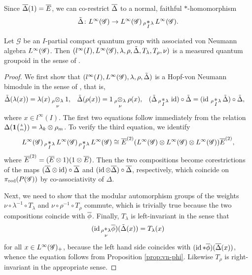 Since $\overline{\Delta}(1)=\overline{E}$, we can co-restrict $\overline{\Delta}$ to  a
normal, faithful $*$-homomorphism
\begin{align*}
  \tilde\Delta \colon L^{\infty}(\mathscr{G}) \to   L^{\infty}(\mathscr{G}) \,{}_{\rho}\!\underset{I}{\ast}\,\!\!_{\lambda}\, L^{\infty}(\mathscr{G}).
\end{align*}
\begin{Theorem}
  Let $\mathscr{G}$ be an $I$-partial compact quantum group with
  associated von Neumann algebra $L^{\infty}(\mathscr{G})$.  Then
  $(l^{\infty}(I),L^{\infty}(\mathscr{G}), \lambda,\rho,\tilde\Delta,
  T_{\lambda},T_{\rho},\nu)$ is a measured quantum groupoid in the
  sense of \cite{Eno2}.
\end{Theorem}
\begin{proof}
We first show that  $(l^{\infty}(I),L^{\infty}(\mathscr{G}),
\lambda,\rho,\tilde\Delta)$ is  a Hopf-von
  Neumann bimodule in the sense of  \cite{Val1}, that is, 
  \begin{align*}
  \tilde\Delta(\lambda(x)) &= \lambda(x) \underset{\nu{}}{_{\rho}\otimes_{\lambda}} 1, &
  \tilde\Delta(\rho(x)) &= 1 \underset{\nu{}}{_{\rho}\otimes_{\lambda}} \rho(x), &
  (\tilde\Delta \,{}_{\rho}\!\underset{I}{\ast}\,\!\!_{\lambda}\, \operatorname{id})\circ \tilde\Delta &= (\operatorname{id} \,{}_{\rho}\!\underset{I}{\ast}\,\!\!_{\lambda}\,
    \tilde\Delta) \circ \tilde\Delta,
\end{align*}
where $x\in l^{\infty}(I)$.
The first two equations follow immediately from the relation
$\Delta(\mathbf{1}{\tiny {\begin{pmatrix} k\\m\end{pmatrix}}})=\lambda_{k} \otimes \rho_{m}$. To verify
the third equation, we identify
\begin{align*}
 L^{\infty}(\mathscr{G}) \,{}_{\rho}\!\underset{I}{\ast}\,\!\!_{\lambda}\, L^{\infty}(\mathscr{G}) \,{}_{\rho}\!\underset{I}{\ast}\,\!\!_{\lambda}\, L^{\infty}(\mathscr{G}) \cong \overline{E}^{(2)}(L^{\infty}(\mathscr{G})
  \otimes L^{\infty}(\mathscr{G}) \otimes L^{\infty}(\mathscr{G}))\overline{E}^{(2)},
\end{align*}
where $\overline{E}^{(2)}=(\overline{E} \otimes 1)(1 \otimes \overline{E})$. Then the two
compositions  become corestrictions of the maps $(\overline{\Delta} \otimes
\operatorname{id})\circ \overline{\Delta}$ and $(\operatorname{id} \otimes \overline{\Delta})\circ \overline{\Delta}$,
respectively, which coincide on $\pi_{\operatorname{\mathrm{red}}}(P(\mathscr{G}))$ by
co-associativity of $\Delta$. 

Next, we need to
show that the modular automorphism groups of the weights $\nu \circ
\lambda^{-1} \circ T_{\lambda}$ and $\nu \circ \rho^{-1} \circ
T_{\rho}$ commute, which is trivially true because the two
compositions coincide with $\overline{\phi}$. Finally,
$T_{\lambda}$ is left-invariant in the sense that
  \begin{align*}
   (\operatorname{id} \underset{\nu}{_{\rho}\ast_{\lambda}} \overline{\phi})(\tilde\Delta(x)) = T_{\lambda}(x) 
  \end{align*}
  for all $x\in L^{\infty}(\mathscr{G})_{+}$, because the left hand
  side coincides with $(\operatorname{id} \ast \overline{\phi})(\overline{\Delta}(x))$, whence the
  equation follows from Proposition
  \ref{prop:vn-phi}. Likewise $T_{\rho}$ is right-invariant in
  the appropriate sense. 
\end{proof}

